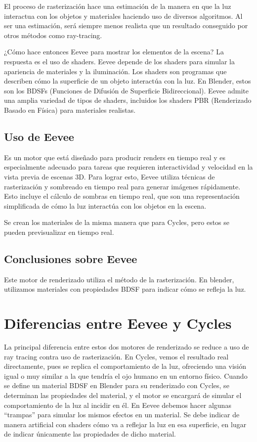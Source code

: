 \documentclass{article}
\begin{document}
El proceso de rasterización hace una estimación de la manera en que la luz interactua con los
objetos y materiales haciendo uso de diversos algoritmos. Al ser una estimación, será siempre
menos realista que un resultado conseguido por otros métodos como ray-tracing.

¿Cómo hace entonces Eevee para mostrar los elementos de la escena? La respuesta es el uso de
shaders. Eevee depende de los shaders para simular la apariencia de materiales y la iluminación.
Los shaders son programas que describen cómo la superficie de un objeto interactúa con la luz. 
En Blender, estos son los BDSFs (Funciones de Difusión de Superficie Bidireccional). 
Eevee admite una amplia variedad de tipos de shaders, incluidos los shaders PBR (Renderizado 
Basado en Física) para materiales realistas.

\subsection{Uso de Eevee}
Es un motor que está diseñado para producir renders en tiempo real y es especialmente adecuado
para tareas que requieren interactividad y velocidad en la vista previa de escenas 3D. 
Para lograr esto, Eevee utiliza técnicas de rasterización y sombreado en tiempo real 
para generar imágenes rápidamente. Esto incluye el cálculo de sombras en tiempo real, que son 
una representación simplificada de cómo la luz interactúa con los objetos en la escena.

Se crean los materiales de la misma manera que para Cycles, pero estos se pueden previsualizar 
en tiempo real.

\subsection{Conclusiones sobre Eevee}
Este motor de renderizado utiliza el método de la rasterización. En blender, utilizamos
materiales con propiedades BDSF para indicar cómo se refleja la luz.

\section{Diferencias entre Eevee y Cycles}
La principal diferencia entre estos dos motores de renderizado se reduce a uso de ray tracing 
contra uso de rasterización.
En Cycles, vemos el resultado real directamente, pues se replica el comportamiento de la luz, 
ofreciendo una visión igual o muy similar a la que tendría el ojo humano en un entorno físico.
Cuando se define un material BDSF en Blender para su renderizado con Cycles, se determinan las
propiedades del material, y el motor se encargará de simular el comportamiento de la luz al 
incidir en él. 
En Eevee debemos hacer algunas “trampas” para simular los mismos efectos en un material. Se 
debe indicar de manera artificial con shaders cómo va a reflejar la luz en esa superficie, 
en lugar de indicar únicamente las propiedades de dicho material.
\end{document}
